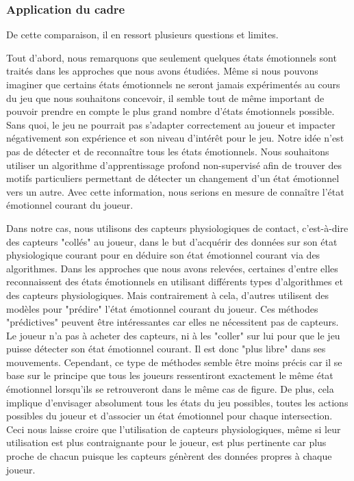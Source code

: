 \documentclass[11pt]{article}
\begin{document}
		\subsubsection{Application du cadre}
			De cette comparaison, il en ressort plusieurs questions et limites.\par
			Tout d'abord, nous remarquons que seulement quelques états émotionnels sont traités dans les approches que nous avons étudiées.
			Même si nous pouvons imaginer que certains états émotionnels ne seront jamais expérimentés au cours du jeu que nous souhaitons concevoir, il semble tout de même important de pouvoir prendre en compte le plus grand nombre d'états émotionnels possible.
			Sans quoi, le jeu ne pourrait pas s'adapter correctement au joueur et impacter négativement son expérience et son niveau d'intérêt pour le jeu.
			Notre idée n'est pas de détecter et de reconnaître tous les états émotionnels.
			Nous souhaitons utiliser un algorithme d'apprentissage profond non-supervisé afin de trouver des motifs particuliers permettant de détecter un changement d'un état émotionnel vers un autre.
			Avec cette information, nous serions en mesure de connaître l'état émotionnel courant du joueur.\par
			Dans notre cas, nous utilisons des capteurs physiologiques de contact, c'est-à-dire des capteurs "collés" au joueur, dans le but d'acquérir des données sur son état physiologique courant pour en déduire son état émotionnel courant via des algorithmes.
			Dans les approches que nous avons relevées, certaines d'entre elles reconnaissent des états émotionnels en utilisant différents types d'algorithmes et des capteurs physiologiques.
			Mais contrairement à cela, d'autres utilisent des modèles pour "prédire" l'état émotionnel courant du joueur.
			Ces méthodes "prédictives" peuvent être intéressantes car elles ne nécessitent pas de capteurs.
			Le joueur n'a pas à acheter des capteurs, ni à les "coller" sur lui pour que le jeu puisse détecter son état émotionnel courant.
			Il est donc "plus libre" dans ses mouvements.
			Cependant, ce type de méthodes semble être moins précis car il se base sur le principe que tous les joueurs ressentiront exactement le même état émotionnel lorsqu'ils se retrouveront dans le même cas de figure.
			De plus, cela implique d'envisager absolument tous les états du jeu possibles, toutes les actions possibles du joueur et d'associer un état émotionnel pour chaque intersection.
			Ceci nous laisse croire que l'utilisation de capteurs physiologiques, même si leur utilisation est plus contraignante pour le joueur, est plus pertinente car plus proche de chacun puisque les capteurs génèrent des données propres à chaque joueur.
\end{document}
